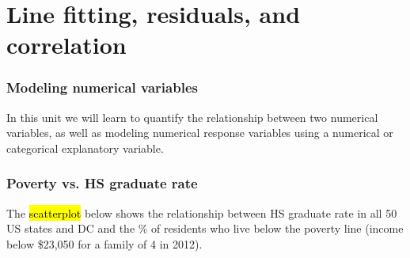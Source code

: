 \section{Line fitting, residuals, and correlation}


\begin{frame}
\frametitle{Modeling numerical variables}

In this unit we will learn to quantify the relationship between two numerical variables, as well as modeling numerical response variables using a numerical or categorical explanatory variable.

\end{frame}


\begin{frame}
\frametitle{Poverty vs. HS graduate rate}

The \hl{scatterplot} below shows the relationship between HS graduate rate in all 50 US states and DC and the \% of residents who live below the poverty line {\small (income below \$23,050 for a family of 4 in 2012)}.

{
\pause
{}
\pause
{}
\pause
{}
\pause
{}
\pause
{}
}

\end{frame}


